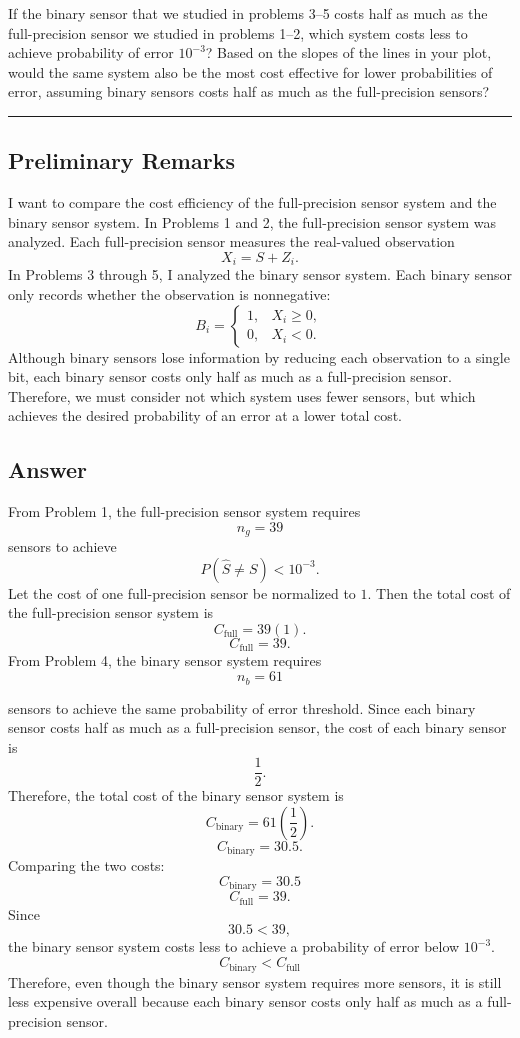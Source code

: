 \documentclass[12pt,a4paper]{article}
\begin{document}
\noindent If the binary sensor that we studied in problems 3--5 costs half as much as the full-precision sensor we studied in problems 1--2, which system costs less to achieve probability of error $10^{-3}$? Based on the slopes of the lines in your plot, would the same system also be the most cost effective for lower probabilities of error, assuming binary sensors costs half as much as the full-precision sensors?\\

\hrule

\subsection{Preliminary Remarks}

I want to compare the cost efficiency of the full-precision sensor system and the binary sensor system. In Problems 1 and 2, the full-precision sensor system was analyzed. Each full-precision sensor measures the real-valued observation
\[
X_i=S+Z_i.
\]
In Problems 3 through 5, I analyzed the binary sensor system. Each binary sensor only records whether the observation is nonnegative:
\[
B_i=
\begin{cases}
1, & X_i\geq 0,\\
0, & X_i<0.
\end{cases}
\]
Although binary sensors lose information by reducing each observation to a single bit, each binary sensor costs only half as much as a full-precision sensor. Therefore, we must consider not which system uses fewer sensors, but which achieves the desired probability of an error at a lower total cost.

\subsection{Answer}

From Problem 1, the full-precision sensor system requires
\[
n_g=39
\]
sensors to achieve
\[
P(\hat{S}\neq S)<10^{-3}.
\]
Let the cost of one full-precision sensor be normalized to \(1\). Then the total cost of the full-precision sensor system is
\[
C_{\text{full}}=39(1).
\]
\[
C_{\text{full}}=39.
\]
From Problem 4, the binary sensor system requires
\[
n_b=61
\]

sensors to achieve the same probability of error threshold. Since each binary sensor costs half as much as a full-precision sensor, the cost of each binary sensor is
\[
\frac{1}{2}.
\]
Therefore, the total cost of the binary sensor system is
\[
C_{\text{binary}}=61\left(\frac{1}{2}\right).
\]
\[
C_{\text{binary}}=30.5.
\]
Comparing the two costs:
\[
C_{\text{binary}}=30.5
\]
\[
C_{\text{full}}=39.
\]
Since
\[
30.5<39,
\]
the binary sensor system costs less to achieve a probability of error below \(10^{-3}\).
\[
\boxed{C_{\text{binary}}<C_{\text{full}}}
\]
Therefore, even though the binary sensor system requires more sensors, it is still less expensive overall because each binary sensor costs only half as much as a full-precision sensor.
\end{document}
